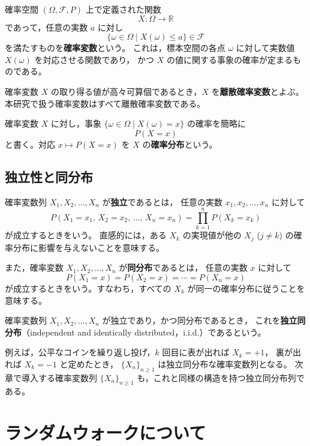 \documentclass[a4j,dvipdfmx]{jsarticle}
\theoremstyle{plainnote}
\begin{document}
確率空間 $(\Omega,\mathcal{F},P)$ 上で定義された関数
\[
  X:\Omega \longrightarrow \mathbb{R}
\]
であって，任意の実数 $a$ に対し
\[
  \{\omega \in \Omega \mid X(\omega)\leq a\} \in \mathcal{F}
\]
を満たすものを\textbf{確率変数}という。
これは，標本空間の各点 $\omega$ に対して実数値 $X(\omega)$ を対応させる関数であり，
かつ $X$ の値に関する事象の確率が定まるものである。

確率変数 $X$ の取り得る値が高々可算個であるとき，$X$ を\textbf{離散確率変数}とよぶ。
本研究で扱う確率変数はすべて離散確率変数である。

確率変数 $X$ に対し，事象 $\{\omega\in\Omega\mid X(\omega)=x\}$ の確率を簡略に
\[
  P(X=x)
\]
と書く。対応 $x \mapsto P(X=x)$ を $X$ の\textbf{確率分布}という。

\subsection{独立性と同分布}

確率変数列 $X_1,X_2,\ldots,X_n$ が\textbf{独立}であるとは，
任意の実数 $x_1,x_2,\ldots,x_n$ に対して
\begin{equation}
  P(X_1=x_1,\,X_2=x_2,\,\ldots,\,X_n=x_n)
  =\prod_{k=1}^{n} P(X_k=x_k)
  \label{eq:independence}
\end{equation}
が成立するときをいう。
直感的には，ある $X_k$ の実現値が他の $X_j$ ($j\neq k$) の確率分布に影響を与えないことを意味する。

また，確率変数 $X_1,X_2,\ldots,X_n$ が\textbf{同分布}であるとは，
任意の実数 $x$ に対して
\begin{equation}
  P(X_1=x)=P(X_2=x)=\cdots=P(X_n=x)
  \label{eq:identical}
\end{equation}
が成立するときをいう。すなわち，すべての $X_k$ が同一の確率分布に従うことを意味する。

確率変数列 $X_1,X_2,\ldots,X_n$ が独立であり，かつ同分布であるとき，
これを\textbf{独立同分布}（independent and identically distributed，i.i.d.）であるという。

例えば，公平なコインを繰り返し投げ，$k$ 回目に表が出れば $X_k=+1$，
裏が出れば $X_k=-1$ と定めたとき，
$\{X_n\}_{n\geq 1}$ は独立同分布な確率変数列となる。
次章で導入する確率変数列 $\{X_n\}_{n\geq 1}$ も，これと同様の構造を持つ独立同分布列である。





\newpage
\section{ランダムウォークについて}
\end{document}
